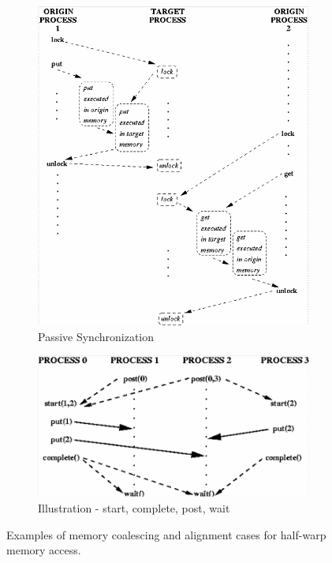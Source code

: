 \documentclass[12pt]{book}
\begin{document}
\begin{figure}[h!]
\begin{subfigure}[b]{0.3\linewidth}
        \includegraphics[width=\linewidth]{images/sync_examp2.png}
        \caption{Passive Synchronization}
        \label{fig:sync_examp2}
    \end{subfigure}
    \hfill
    \begin{subfigure}[b]{0.3\linewidth}
        \centering
        \includegraphics[width=\linewidth]{images/sync_examp3.png}
        \caption{Illustration - start, complete, post, wait}
        \label{fig:sync_examp3}
    \end{subfigure}
    \caption{Examples of memory coalescing and alignment cases for half-warp memory access.}
    \label{fig:sync_examples}
\end{figure}
\end{document}
